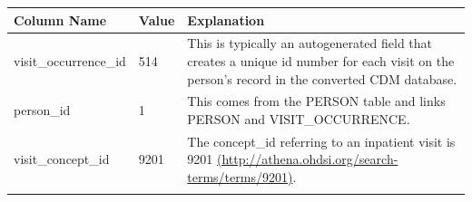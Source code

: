 \documentclass[]{book}
\begin{document}
\begin{longtable}[]{@{}lll@{}}
\toprule
\begin{minipage}[b]{0.25\columnwidth}\raggedright\strut
Column Name\strut
\end{minipage} & \begin{minipage}[b]{0.17\columnwidth}\raggedright\strut
Value\strut
\end{minipage} & \begin{minipage}[b]{0.49\columnwidth}\raggedright\strut
Explanation\strut
\end{minipage}\tabularnewline
\midrule
\endhead
\begin{minipage}[t]{0.25\columnwidth}\raggedright\strut
visit\_occurrence\_id\strut
\end{minipage} & \begin{minipage}[t]{0.17\columnwidth}\raggedright\strut
514\strut
\end{minipage} & \begin{minipage}[t]{0.49\columnwidth}\raggedright\strut
This is typically an autogenerated field that creates a unique id number
for each visit on the person's record in the converted CDM
database.\strut
\end{minipage}\tabularnewline
\begin{minipage}[t]{0.25\columnwidth}\raggedright\strut
person\_id\strut
\end{minipage} & \begin{minipage}[t]{0.17\columnwidth}\raggedright\strut
1\strut
\end{minipage} & \begin{minipage}[t]{0.49\columnwidth}\raggedright\strut
This comes from the PERSON table and links PERSON and
VISIT\_OCCURRENCE.\strut
\end{minipage}\tabularnewline
\begin{minipage}[t]{0.25\columnwidth}\raggedright\strut
visit\_concept\_id\strut
\end{minipage} & \begin{minipage}[t]{0.17\columnwidth}\raggedright\strut
9201\strut
\end{minipage} & \begin{minipage}[t]{0.49\columnwidth}\raggedright\strut
The concept\_id referring to an inpatient visit is 9201
\href{http://athena.ohdsi.org/search-terms/terms/9201}{(http://athena.ohdsi.org/search-terms/terms/9201)}.\strut
\end{minipage}\tabularnewline
\begin{minipage}[t]{0.25\columnwidth}\raggedright\strut

\end{minipage}
\end{longtable}
\end{document}
